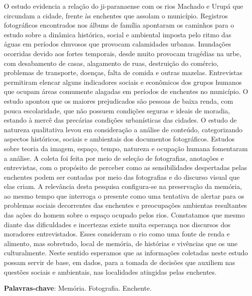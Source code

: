 \documentclass[article,12pt,onesidea,4paper,english,brazil]{abntex2}
\begin{document}
	\noindent O estudo evidencia a relação do ji-paranaense com os rios Machado e Urupá que
	circundam a cidade, frente às enchentes que assolam o município. Registros
	fotográficos encontrados nos álbuns de família apontaram os caminhos para o
	estudo sobre a dinâmica histórica, social e ambiental imposta pelo ritmo das águas
	em períodos chuvosos que provocam calamidades urbanas. Inundações ocorridas
	devido aos fortes temporais, desde muito provocam tragédias na urbe, com
	desabamento de casas, alagamento de ruas, destruição do comércio, problemas de
	transporte, doenças, falta de comida e outras mazelas. Entrevistas permitiram
	elencar alguns indicadores sociais e econômicos dos grupos humanos que ocupam
	áreas comumente alagadas em períodos de enchentes no município. O estudo
	apontou que os maiores prejudicados são pessoas de baixa renda, com pouca
	escolaridade, que não possuem condições seguras e ideais de moradia, estando à
	mercê das precárias condições urbanísticas das cidades. O estudo de natureza
	qualitativa levou em consideração a análise de conteúdo, categorizando aspectos
	históricos, sociais e ambientais dos documentos fotográficos. Estudos sobre teoria
	da imagem, espaço, tempo, natureza e ocupação humana fomentaram a análise. A
	coleta foi feita por meio de seleção de fotografias, anotações e entrevistas, com o
	propósito de perceber como as sensibilidades despertadas pelas enchentes podem
	ser contadas por meio das fotografias e do discurso visual que elas criam. A
	relevância desta pesquisa configura-se na preservação da memória, ao mesmo
	tempo que interroga o presente como uma tentativa de alertar para os problemas
	sociais decorrentes das enchentes e preocupações ambientas resultantes das ações
	do homem sobre o espaço ocupado pelos rios. Constatamos que mesmo diante das
	dificuldades e incertezas existe muita esperança nos discursos dos moradores
	entrevistados. Esses consideram o rio como uma fonte de renda e alimento, mas
	sobretudo, local de memória, de histórias e vivências que os une culturalmente.
	Neste sentido esperamos que as informações coletadas neste estudo possam servir
	de base, em dados, para a tomada de decisões que auxiliem nas questões sociais e
	ambientais, nas localidades atingidas pelas enchentes.
	
	\vspace{\onelineskip}
	
	\noindent
	\textbf{Palavras-chave}: Memória. Fotografia. Enchente.
	
\end{document}
